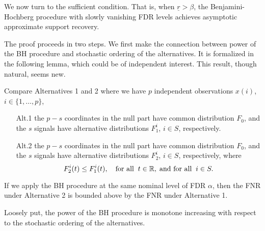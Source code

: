 We now turn to the sufficient condition. 
That is, when $\underline{r} > \beta$, the Benjamini-Hochberg procedure with slowly vanishing FDR levels achieves asymptotic approximate support recovery.

The proof proceeds in two steps.
We first make the connection between power of the BH procedure and stochastic ordering of the alternatives.
It is formalized in the following lemma, which could be of independent interest.
This result, though natural, seems new. 

\begin{lemma} \label{lemma:monotonicity-BH-procedure}
Compare Alternatives 1 and 2 where we have $p$ independent observations $x(i)$, $i\in\{1,\ldots,p\}$,
\begin{enumerate}
    \item[Alt.1] the $p-s$ coordinates in the null part have common distribution $F_0$, and the $s$ signals have alternative distributions $F^{i}_1$, $i\in S$, respectively.
    \item[Alt.2] the $p-s$ coordinates in the null part have common distribution $F_0$, and the $s$ signals have alternative distributions $F^{i}_2$, $i\in S$, respectively, where
    $$ F^{i}_2(t) \le F^{i}_1(t), \quad \text{for all} \;\; t\in\mathbb R, \; \text{and for all} \;\; i\in S.$$
\end{enumerate}
If we apply the BH procedure at the same nominal level of FDR $\alpha$, then the FNR under Alternative 2 is bounded above by the FNR under Alternative 1.
\end{lemma}

Loosely put, the power of the BH procedure is monotone increasing with respect to the stochastic ordering of the alternatives.

